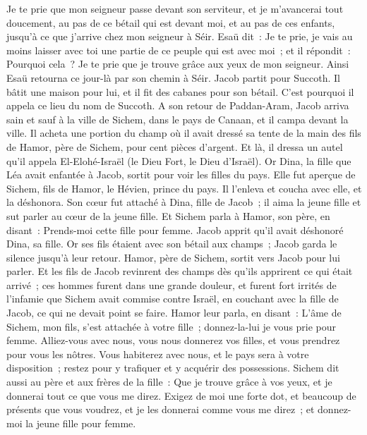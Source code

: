 \begin{multicols}{2}
Je te prie que mon seigneur passe devant son serviteur, et je m'avancerai tout doucement, au pas de ce bétail qui est devant moi, et au pas de ces enfants, jusqu'à ce que j'arrive chez mon seigneur à Séir.
Esaü dit~: Je te prie, je vais au moins laisser avec toi une partie de ce peuple qui est avec moi~; et il répondit~: Pourquoi cela~? Je te prie que je trouve grâce aux yeux de mon seigneur.
Ainsi Esaü retourna ce jour-là par son chemin à Séir.
Jacob partit pour Succoth. Il bâtit une maison pour lui, et il fit des cabanes pour son bétail. C'est pourquoi il appela ce lieu du nom de Succoth.
A son retour de Paddan-Aram, Jacob arriva sain et sauf à la ville de Sichem, dans le pays de Canaan, et il campa devant la ville.
Il acheta une portion du champ où il avait dressé sa tente de la main des fils de Hamor, père de Sichem, pour cent pièces d'argent.
Et là, il dressa un autel qu'il appela El-Elohé-Israël (le Dieu Fort, le Dieu d'Israël).
\VerseOne{}Or Dina, la fille que Léa avait enfantée à Jacob, sortit pour voir les filles du pays.
Elle fut aperçue de Sichem, fils de Hamor, le Hévien, prince du pays. Il l'enleva et coucha avec elle, et la déshonora.
Son cœur fut attaché à Dina, fille de Jacob~; il aima la jeune fille et sut parler au cœur de la jeune fille.
Et Sichem parla à Hamor, son père, en disant~: Prends-moi cette fille pour femme.
Jacob apprit qu'il avait déshonoré Dina, sa fille. Or ses fils étaient avec son bétail aux champs~; Jacob garda le silence jusqu'à leur retour.
Hamor, père de Sichem, sortit vers Jacob pour lui parler.
Et les fils de Jacob revinrent des champs dès qu'ils apprirent ce qui était arrivé~; ces hommes furent dans une grande douleur, et furent fort irrités de l'infamie que Sichem avait commise contre Israël, en couchant avec la fille de Jacob, ce qui ne devait point se faire.
Hamor leur parla, en disant~: L'âme de Sichem, mon fils, s'est attachée à votre fille~; donnez-la-lui je vous prie pour femme.
Alliez-vous avec nous, vous nous donnerez vos filles, et vous prendrez pour vous les nôtres.
Vous habiterez avec nous, et le pays sera à votre disposition~; restez pour y trafiquer et y acquérir des possessions.
Sichem dit aussi au père et aux frères de la fille~: Que je trouve grâce à vos yeux, et je donnerai tout ce que vous me direz.
Exigez de moi une forte dot, et beaucoup de présents que vous voudrez, et je les donnerai comme vous me direz~; et donnez-moi la jeune fille pour femme.

\end{multicols}
